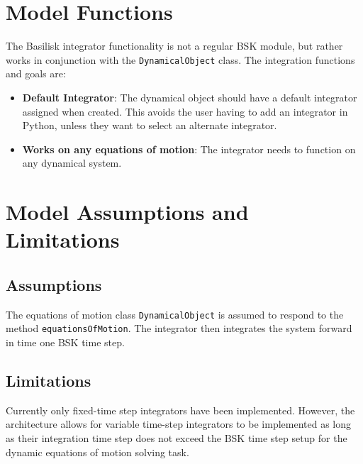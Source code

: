 
\section{Model Functions}

The Basilisk integrator functionality is not a regular BSK module, but rather works in conjunction with the {\tt DynamicalObject} class.    The integration functions and goals are:


\begin{itemize}
	\item \textbf{Default Integrator}: The dynamical object should have a default integrator assigned when created.  This avoids the user having to add an integrator in Python, unless they want to select an alternate integrator.
	\item \textbf{Works on any equations of motion}: The integrator needs to function on any dynamical system.
\end{itemize}



\section{Model Assumptions and Limitations}

\subsection{Assumptions}

The equations of motion class {\tt DynamicalObject} is assumed to respond to the method  {\tt equationsOfMotion}.  The integrator then integrates the system forward in time one BSK time step.  

\subsection{Limitations}

Currently only fixed-time step integrators have been implemented.  However, the architecture allows for variable time-step integrators to be implemented as long as their integration time step does not exceed the BSK time step setup for the dynamic equations of motion solving task. 
